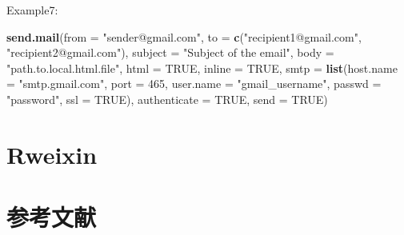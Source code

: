 \documentclass[]{book}
\newenvironment{Shaded}{\begin{snugshade}}{\end{snugshade}}
\newcommand{\KeywordTok}[1]{\textcolor[rgb]{0.13,0.29,0.53}{\textbf{#1}}}
\newcommand{\DataTypeTok}[1]{\textcolor[rgb]{0.13,0.29,0.53}{#1}}
\newcommand{\DecValTok}[1]{\textcolor[rgb]{0.00,0.00,0.81}{#1}}
\newcommand{\StringTok}[1]{\textcolor[rgb]{0.31,0.60,0.02}{#1}}
\newcommand{\OtherTok}[1]{\textcolor[rgb]{0.56,0.35,0.01}{#1}}
\newcommand{\NormalTok}[1]{#1}
\theoremstyle{definition}
\theoremstyle{definition}
\theoremstyle{definition}
\theoremstyle{remark}
\begin{document}
Example7:

\begin{Shaded}
\begin{Highlighting}[]
\KeywordTok{send.mail}\NormalTok{(}\DataTypeTok{from =} \StringTok{"sender@gmail.com"}\NormalTok{,}
          \DataTypeTok{to =} \KeywordTok{c}\NormalTok{(}\StringTok{"recipient1@gmail.com"}\NormalTok{, }\StringTok{"recipient2@gmail.com"}\NormalTok{),}
          \DataTypeTok{subject =} \StringTok{"Subject of the email"}\NormalTok{,}
          \DataTypeTok{body =} \StringTok{"path.to.local.html.file"}\NormalTok{,}
          \DataTypeTok{html =} \OtherTok{TRUE}\NormalTok{,}
          \DataTypeTok{inline =} \OtherTok{TRUE}\NormalTok{,}
          \DataTypeTok{smtp =} \KeywordTok{list}\NormalTok{(}\DataTypeTok{host.name =} \StringTok{"smtp.gmail.com"}\NormalTok{, }\DataTypeTok{port =} \DecValTok{465}\NormalTok{, }\DataTypeTok{user.name =} \StringTok{"gmail_username"}\NormalTok{, }\DataTypeTok{passwd =} \StringTok{"password"}\NormalTok{, }\DataTypeTok{ssl =} \OtherTok{TRUE}\NormalTok{),}
          \DataTypeTok{authenticate =} \OtherTok{TRUE}\NormalTok{,}
          \DataTypeTok{send =} \OtherTok{TRUE}\NormalTok{)}
\end{Highlighting}
\end{Shaded}

\chapter{Rweixin}\label{rweixin}

\chapter{参考文献}\label{reference}


\end{document}
